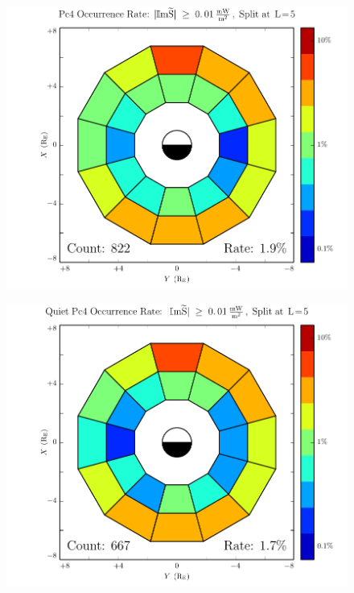 \begin{figure}[!htb]
    \centering
    \includegraphics[width=\textwidth]{figures/rate_all.pdf}
    \caption[Pc4 Rate]{
    }
    \label{fig_rate_all}
\end{figure}

\begin{figure}[!htb]
    \centering
    \includegraphics[width=\textwidth]{figures/rate_calm.pdf}
    \caption[Pc4 Rate: Dst$\geq \SI{-30}{\nT}$]{
      \todo{$\cdots$}
    }
    \label{fig_rate_calm}
\end{figure}

